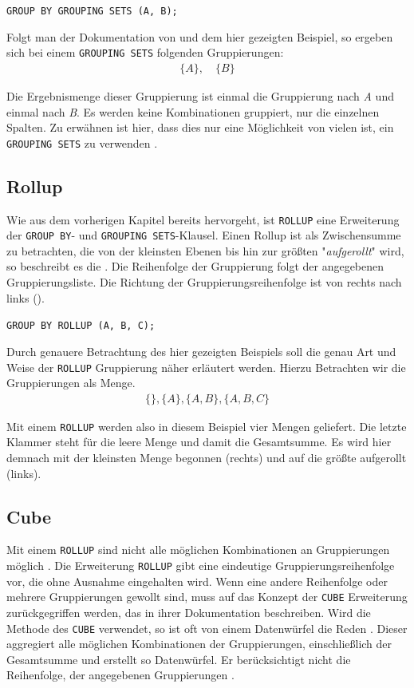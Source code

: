 \texttt{GROUP BY GROUPING SETS (A, B);}

Folgt man der Dokumentation von \citet{oracle16} und dem hier gezeigten Beispiel,
so ergeben sich bei einem \texttt{GROUPING SETS} folgenden Gruppierungen:
\begin{align*}
	\{A\}, \quad \{B\}
\end{align*}

Die Ergebnismenge dieser Gruppierung ist einmal die Gruppierung nach \textit{A}
und einmal nach \textit{B}. Es werden keine Kombinationen gruppiert, nur die einzelnen
Spalten. Zu erwähnen ist hier, dass dies nur eine Möglichkeit von vielen ist,
ein \texttt{GROUPING SETS} zu verwenden \citet{oracle16}.

\subsection{Rollup}
\label{subsec:rollup} Wie aus dem vorherigen Kapitel bereits hervorgeht, ist \texttt{ROLLUP}
eine Erweiterung der \texttt{GROUP BY}- und \texttt{GROUPING SETS}-Klausel.
Einen Rollup ist als Zwischensumme zu betrachten, die von der kleinsten Ebenen bis
hin zur größten "\textit{aufgerollt}" wird, so beschreibt es die \citet{oracle99}.
Die Reihenfolge der Gruppierung folgt der angegebenen Gruppierungsliste. Die
Richtung der Gruppierungsreihenfolge ist von rechts nach links (\cite{oracle16}).

\texttt{GROUP BY ROLLUP (A, B, C);}

Durch genauere Betrachtung des hier gezeigten Beispiels soll die genau Art und
Weise der \texttt{ROLLUP} Gruppierung näher erläutert werden. Hierzu Betrachten
wir die Gruppierungen als Menge.
\begin{align*}
	\{ \}, \{A\}, \{A, B\}, \{A, B, C\}
\end{align*}

Mit einem \texttt{ROLLUP} werden also in diesem Beispiel vier Mengen geliefert.
Die letzte Klammer steht für die leere Menge und damit die Gesamtsumme. Es wird hier
demnach mit der kleinsten Menge begonnen (rechts) und auf die größte aufgerollt (links).

\subsection{Cube}
\label{susec:cube} Mit einem \texttt{ROLLUP} sind nicht alle möglichen
Kombinationen an Gruppierungen möglich \citep{oracle99}. Die Erweiterung \texttt{ROLLUP}
gibt eine eindeutige Gruppierungsreihenfolge vor, die ohne Ausnahme eingehalten
wird. Wenn eine andere Reihenfolge oder mehrere Gruppierungen gewollt sind, muss
auf das Konzept der \texttt{CUBE} Erweiterung zurückgegriffen werden, das \citet{oracle99}
in ihrer Dokumentation beschreiben. Wird die Methode des \texttt{CUBE} verwendet,
so ist oft von einem Datenwürfel die Reden \citep{oracle99}. Dieser aggregiert
alle möglichen Kombinationen der Gruppierungen, einschließlich der Gesamtsumme und
erstellt so Datenwürfel. Er berücksichtigt nicht die Reihenfolge, der angegebenen
Gruppierungen \citep{oracle99}.

